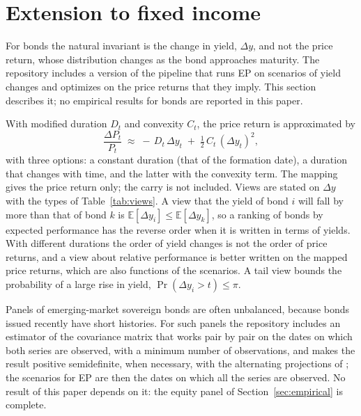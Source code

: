 \documentclass[11pt]{article}
\newcommand{\E}{\mathbb{E}}
\begin{document}
\section{Extension to fixed income}\label{sec:bonds}

For bonds the natural invariant is the change in yield, $\Delta y$, and
not the price return, whose distribution changes as the bond approaches
maturity. The repository includes a version of the pipeline that runs EP on
scenarios of yield changes and optimizes on the price returns that they
imply. This section describes it; no empirical results for bonds are
reported in this paper.

With modified duration $D_t$ and convexity $C_t$, the price return is
approximated by
\begin{equation}\label{eq:duration}
\frac{\Delta P_t}{P_{t}} \;\approx\; -\,D_{t}\,\Delta y_t \;+\; \tfrac{1}{2}\,C_{t}\,(\Delta y_t)^2,
\end{equation}
with three options: a constant duration (that of the formation date), a
duration that changes with time, and the latter with the convexity term.
The mapping gives the price return only; the carry is not included.
Views are stated on $\Delta y$ with the types of Table~\ref{tab:views}. A
view that the yield of bond $i$ will fall by more than that of bond $k$ is
$\E[\Delta y_i] \le \E[\Delta y_k]$, so a ranking of bonds by expected
performance has the reverse order when it is written in terms of yields.
With different durations the order of yield changes is not the order of
price returns, and a view about relative performance is better written on
the mapped price returns, which are also functions of the scenarios. A tail
view bounds the probability of a large rise in yield,
$\Pr(\Delta y_i > t) \le \pi$.

Panels of emerging-market sovereign bonds are often unbalanced, because
bonds issued recently have short histories. For such panels the repository
includes an estimator of the covariance matrix that works pair by pair on
the dates on which both series are observed, with a minimum number of
observations, and makes the result positive semidefinite, when necessary,
with the alternating projections of \citet{Higham2002}; the scenarios for
EP are then the dates on which all the series are observed. No result of
this paper depends on it: the equity panel of
Section~\ref{sec:empirical} is complete.
\end{document}

